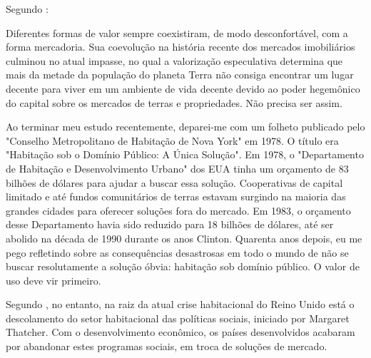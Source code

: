 \documentclass[
	12pt,				%
	oneside,			%
	a4paper,			%
	chapter=TITLE,		%
	section=TITLE,		%
	english,			%
	brazil				%
	]{abntex2}
\begin{document}
Segundo \textcite{terraredonda}:
\begin{citacao}
Diferentes formas de valor sempre coexistiram, de modo desconfortável, com a
forma mercadoria. Sua coevolução na história recente dos mercados imobiliários
culminou no atual impasse, no qual a valorização especulativa determina que mais
da metade da população do planeta Terra não consiga encontrar um lugar decente
para viver em um ambiente de vida decente devido ao poder hegemônico do capital
sobre os mercados de terras e propriedades. Não precisa ser assim.

Ao terminar meu estudo recentemente, deparei-me com um folheto publicado pelo
"Conselho Metropolitano de Habitação de Nova York" em 1978. O título era
"Habitação sob o Domínio Público: A Única Solução". Em 1978, o "Departamento de
Habitação e Desenvolvimento Urbano" dos EUA tinha um orçamento de 83 bilhões de
dólares para ajudar a buscar essa solução. Cooperativas de capital limitado e
até fundos comunitários de terras estavam surgindo na maioria das grandes
cidades para oferecer soluções fora do mercado. Em 1983, o orçamento desse
Departamento havia sido reduzido para 18 bilhões de dólares, até ser abolido na
década de 1990 durante os anos Clinton. Quarenta anos depois, eu me pego
refletindo sobre as consequências desastrosas em todo o mundo de não se buscar
resolutamente a solução óbvia: habitação sob domínio público. O valor de uso
deve vir primeiro.
\end{citacao}
Segundo \textcite{rolnik}, no entanto, na raiz da atual crise habitacional do Reino Unido
está o descolamento do setor habitacional das políticas sociais, iniciado por
Margaret Thatcher. Com o desenvolvimento econômico, os países desenvolvidos
acabaram por abandonar estes programas sociais, em troca de soluções de
mercado.
\end{document}
